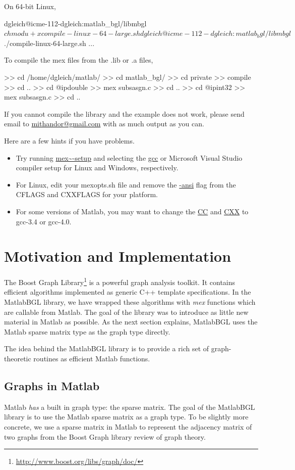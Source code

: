 \documentclass[12pt]{article}
\newcommand{\mycmd}[1]{\url{#1}}
\begin{document}
On 64-bit Linux, 
\begin{mcode}
dgleich@icme-112-dgleich:matlab_bgl/libmbgl$ chmod u+x compile-linux-64-large.sh
dgleich@icme-112-dgleich:matlab_bgl/libmbgl$ ./compile-linux-64-large.sh
...
\end{mcode}

To compile the mex files from the .lib or .a files, 
\begin{mcode}
>> cd /home/dgleich/matlab/ %
>> cd matlab_bgl/
>> cd private
>> compile
>> cd ..
>> cd @ipdouble
>> mex subsasgn.c
>> cd ..
>> cd @ipint32
>> mex subsasgn.c
>> cd ..
\end{mcode}
If you cannot compile the library and the example does not work, please send email to \url{mithandor@gmail.com} with as much output as you can.  

Here are a few hints if you have problems.
\begin{itemize}
\item Try running \mycmd{mex~-setup} and selecting the \mycmd{gcc} or Microsoft Visual Studio compiler setup for Linux and Windows, respectively.
\item For Linux, edit your mexopts.sh file and remove the \mycmd{-ansi} flag from the CFLAGS and CXXFLAGS for your platform.
\item For some versions of Matlab, you may want to change the \mycmd{CC} and \mycmd{CXX} to gcc-3.4 or gcc-4.0.
\end{itemize}

\section{Motivation and Implementation}
The Boost Graph Library\footnote{\url{http://www.boost.org/libs/graph/doc/}} is a powerful graph analysis toolkit.  It contains efficient algorithms implemented as generic C++ template specifications.  In the MatlabBGL library, we have wrapped these algorithms with \emph{mex} functions which are callable from Matlab.  The goal of the library was to introduce as little new material in Matlab as possible.  As the next section explains, MatlabBGL uses the Matlab sparse matrix type as the graph type directly.

The idea behind the MatlabBGL library is to provide a rich set of graph-theoretic routines as efficient Matlab functions.  

\subsection{Graphs in Matlab}
Matlab \emph{has} a built in graph type: the sparse matrix.  The goal of the MatlabBGL library is to use the Matlab sparse matrix as a graph type.  To be slightly more concrete, we use a sparse matrix in Matlab to represent the adjacency matrix of two graphs from the Boost Graph library review of graph theory.
\end{document}
